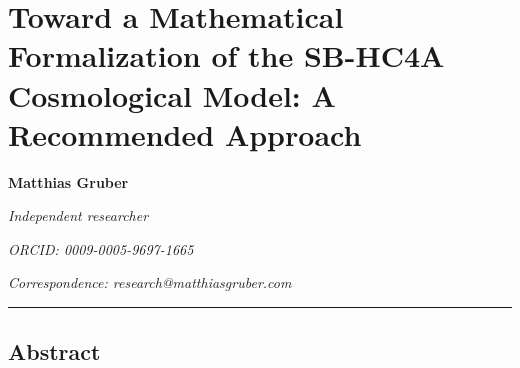\documentclass[
]{article}
\author{}
\date{}
\begin{document}
\hypertarget{toward-a-mathematical-formalization-of-the-sb-hc4a-cosmological-model-a-recommended-approach}{%
\section{Toward a Mathematical Formalization of the SB-HC4A Cosmological
Model: A Recommended
Approach}\label{toward-a-mathematical-formalization-of-the-sb-hc4a-cosmological-model-a-recommended-approach}}

\textbf{Matthias Gruber}

\emph{Independent researcher}

\emph{ORCID: 0009-0005-9697-1665}

\emph{Correspondence: research@matthiasgruber.com}

\begin{center}\rule{0.5\linewidth}{0.5pt}\end{center}

\hypertarget{abstract}{%
\subsection{Abstract}\label{abstract}}
\end{document}
